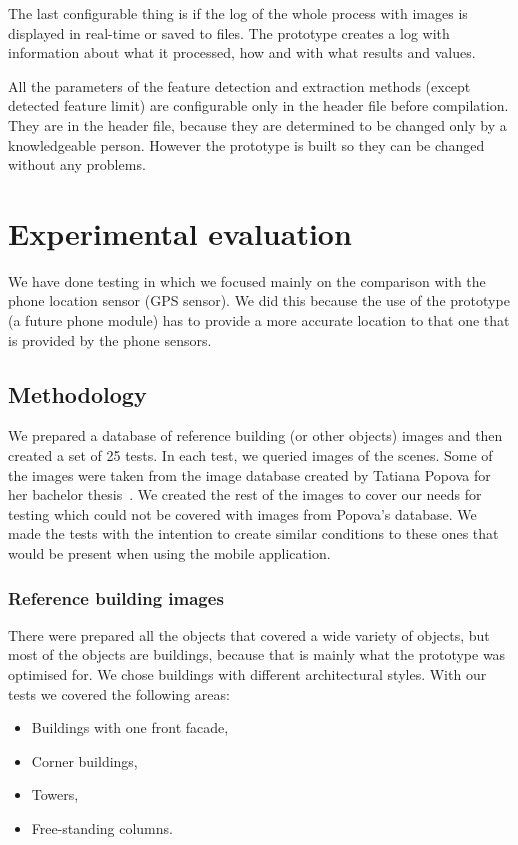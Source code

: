 \documentclass[thesis=B,english]{FITthesis}[2019/12/23]
\begin{document}
            The last configurable thing is if the log of the whole process with images is displayed in real-time or saved to files. The prototype creates a log with information about what it processed, how and with what results and values.
            
            All the parameters of the feature detection and extraction methods (except detected feature limit) are configurable only in the header file before compilation. They are in the header file, because they are determined to be changed only by a knowledgeable person. However the prototype is built so they can be changed without any problems.
                
    \section{Experimental evaluation}
        We have done testing in which we focused mainly on the comparison with the phone location sensor (GPS sensor). We did this because the use of the prototype (a future phone module) has to provide a more accurate location to that one that is provided by the phone sensors.
                
        \subsection{Methodology}
            We prepared a database of reference building (or other objects) images and then created a set of 25 tests. In each test, we queried images of the scenes. Some of the images were taken from the image database created by Tatiana Popova for her bachelor thesis~\cite{Popova2021}. We created the rest of the images to cover our needs for testing which could not be covered with images from Popova's database. We made the tests with the intention to create similar conditions to these ones that would be present when using the mobile application.
                
            \subsubsection*{Reference building images}
                There were prepared all the objects that covered a wide variety of objects, but most of the objects are buildings, because that is mainly what the prototype was optimised for. We chose buildings with different architectural styles. With our tests we covered the following areas:
                \begin{itemize}
                    \item Buildings with one front facade,
                    \item Corner buildings,
                    \item Towers,
                    \item Free-standing columns.
                \end{itemize}
                    
\end{document}
